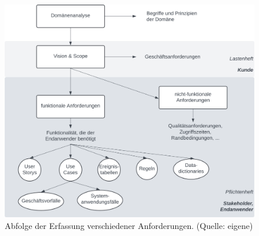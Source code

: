 \begin{figure}
    \centering
    \includegraphics[scale=0.35]{part one/Requirements Engineering/img/anforderung}
    \caption{Abfolge der Erfassung verschiedener Anforderungen. (Quelle: eigene)}
    \label{fig:anforderung}
\end{figure}